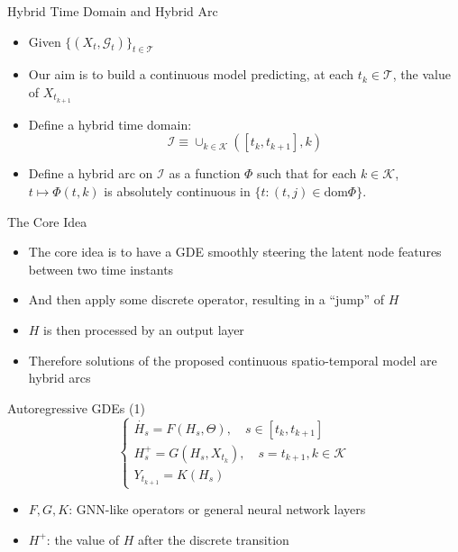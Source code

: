 \documentclass{beamer}
\begin{document}
\begin{frame}{Hybrid Time Domain and Hybrid Arc}
\begin{itemize}
\item Given $\{(X_t,\mathcal{G}_t)\}_{t\in\mathcal{T}}$
\item Our aim is to build a continuous model predicting, at each $t_k\in\mathcal{T}$, the value of $X_{t_{k+1}}$
\item Define a hybrid time domain:\[
\mathcal{I}\equiv\cup_{k\in\mathcal{K}}([t_k,t_{k+1}],k)
\]
\item Define a hybrid arc on $\mathcal{I}$ as a function $\Phi$ such that for each $k\in\mathcal K$, $t\mapsto\Phi(t,k)$ is absolutely continuous in $\{t:(t,j)\in\text{dom}\Phi\}$.
\end{itemize}
\end{frame}


\begin{frame}{The Core Idea}
\begin{itemize}
\item The core idea is to have a GDE smoothly steering the latent node features between two time instants
\item And then apply some discrete operator, resulting in a ``jump'' of $H$
\item $H$ is then processed by an output layer
\item Therefore solutions of the proposed continuous spatio-temporal model are hybrid arcs
\end{itemize}
\end{frame}


\begin{frame}{Autoregressive GDEs (1)}
\[
\begin{cases}
\dot{H_s}=F(H_s,\Theta),\quad s\in[t_k,t_{k+1}]\\
H_s^+=G(H_s,X_{t_k}),\quad s=t_{k+1},k\in\mathcal{K}\\
Y_{t_{k+1}}=K(H_s)
\end{cases}
\]
\begin{itemize}
\item $F,G,K$: GNN-like operators or general neural network layers
\item $H^+$: the value of $H$ after the discrete transition
\end{itemize}
\end{frame}
\end{document}
